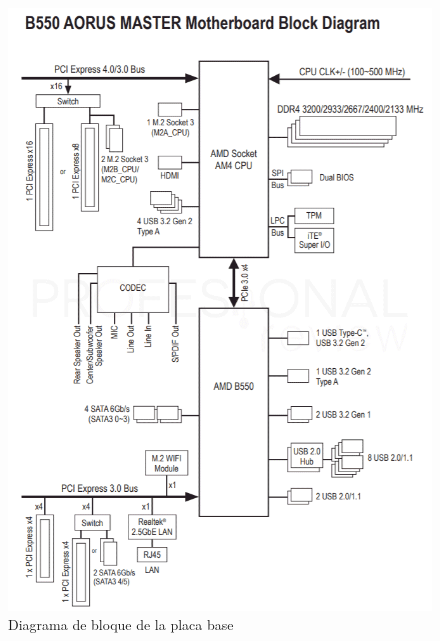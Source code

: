 \documentclass{article}
\begin{document}
        \begin{figure}[h]
          \centering
          \includegraphics[scale = 0.4]{img/block_diagram.png}
          \caption{Diagrama de bloque de la placa base}
        \end{figure}
        
\end{document}
